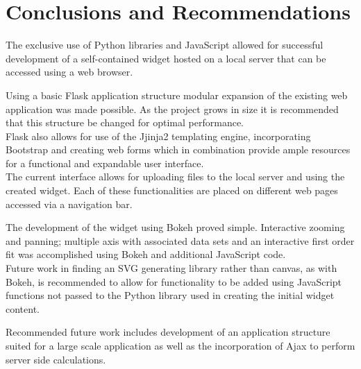 \documentclass[a4paper,12pt]{article}
\begin{document}
\section{Conclusions and Recommendations}
The exclusive use of Python libraries and JavaScript allowed for successful development of a self-contained widget hosted on a local server that can be accessed using a web browser.

Using a basic Flask application structure modular expansion of the existing web application was made possible. As the project grows in size it is recommended that this structure be changed for optimal performance.\\Flask also allows for use of the Jjinja2 templating engine, incorporating Bootstrap and creating web forms which in combination provide ample resources for a functional and expandable user interface.\\The current interface allows for uploading files to the local server and using the created widget. Each of these functionalities are placed on different web pages accessed via a navigation bar.

The development of the widget using Bokeh proved simple. Interactive zooming and panning; multiple axis with associated data sets and an interactive first order fit was accomplished using Bokeh and additional JavaScript code.\\Future work in finding an SVG generating library rather than canvas, as with Bokeh, is recommended to allow for functionality to be added using JavaScript functions not passed to the Python library used in creating the initial widget content.

Recommended future work includes development of an application structure suited for a large scale application as well as the incorporation of Ajax to perform server side calculations.



\end{document}
